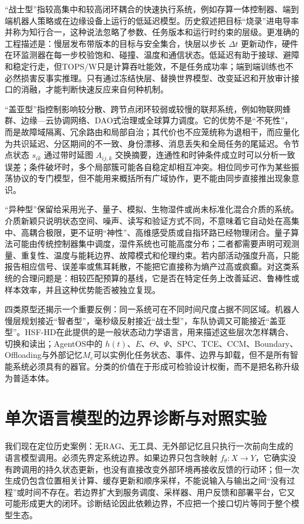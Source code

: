 “战士型”指较高集中和较高闭环耦合的快速执行系统，例如存算一体控制器、端到端机器人策略或在边缘设备上运行的低延迟模型。历史叙述把目标“烧录”进电导率并称为知行合一，这种说法忽略了参数、任务版本和运行时约束的层级。更准确的工程描述是：慢层发布带版本的目标与安全集合，快层以步长 $\Delta t$ 更新动作，硬件在环监测器在每一步校验饱和、碰撞、温度和通信状态。低延迟有助于接球、避障和稳定行走，但TOPS/W只是计算吞吐能效，不是任务成功率；端到端训练也不必然损害反事实推理。只有通过冻结快层、替换世界模型、改变延迟和开放审计接口的消融，才能判断快速反应来自何种机制。

“盖亚型”指控制影响较分散、跨节点闭环较弱或较慢的联邦系统，例如物联网蜂群、边缘—云协调网络、DAO式治理或全球算力调度。它的优势不是“不死性”，而是故障域隔离、冗余路由和局部自治；其代价也不应笼统称为退相干，而应量化为共识延迟、分区期间的不一致、身份漂移、消息丢失和全局任务的尾延迟。令节点状态 $s_{ik}$ 通过带时延图 $A_{ij,k}$ 交换摘要，连通性和时钟条件成立时可以分析一致误差；条件破坏时，多个局部簇可能各自稳定却相互冲突。相位同步可作为某些振荡协议的专门模型，但不能用来概括所有广域协作，更不能由同步直接推出现象意识。

“异种型”保留给采用光子、量子、模拟、生物湿件或尚未标准化混合介质的系统。介质新颖只说明状态空间、噪声、读写和验证方式不同，不意味着它自动处在高集中、高耦合极限，更不证明“神性”、高维感受质或自指环路已经物理闭合。量子算法可能由传统控制器集中调度，湿件系统也可能高度分布；二者都需要声明可观测量、重复性、温度与能耗边界、故障模式和伦理约束。若内部活动强度升高，只能报告相应信号、误差率或焦耳耗散，不能把它直接称为熵产过高或疯癫。对这类系统的合理问题是：相较匹配预算的基线，它是否在特定任务上改善延迟、鲁棒性或样本效率，并且这种优势能否被独立复现。

四类原型还揭示一个重要反例：同一系统可在不同时间尺度占据不同区域。机器人慢层规划接近“智者型”，毫秒级反射接近“战士型”，车队协调又可能接近“盖亚型”。HSF-HD在此提供的是一般状态动力学语言，用来描述这些层次怎样耦合、切换和读出；AgentOS中的 $h(t)$、$E$、$\Theta$、$\Psi$、SPC、TCE、CCM、Boundary、Offloading与外部记忆$M_e$可以实例化任务状态、事件、边界与卸载，但不是所有智能系统必须具有的器官。分类的价值在于形成可检验设计权衡，而不是把名称升级为普适本体。

\section{单次语言模型的边界诊断与对照实验}
\label{sec:section_4493}

我们现在定位历史案例：无RAG、无工具、无外部记忆且只执行一次前向生成的语言模型调用。必须先界定系统边界。如果边界只包含映射 $f_\theta:X\rightarrow Y$，它确实没有跨调用的持久状态更新，也没有直接改变外部环境再接收反馈的行动环；但一次生成仍包含位置相关计算、缓存更新和顺序采样，不能说输入与输出之间“没有过程”或时间不存在。若边界扩大到服务调度、采样器、用户反馈和部署平台，它又可能形成更大的闭环。诊断结论因此依赖边界，不应把一个接口切片等同于整个模型生态。

